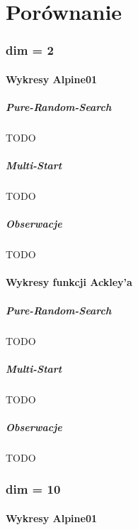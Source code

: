 \documentclass{lab}
\begin{document}
\subsection{}

\newpage
\part{Porównanie}
\section{dim = 2}
\subsection{Wykresy Alpine01}
\subsubsection{Pure-Random-Search}
TODO

\subsubsection{Multi-Start}
TODO

\subsubsection{Obserwacje}
TODO

\subsection{Wykresy funkcji Ackley’a}
\subsubsection{Pure-Random-Search}
TODO

\subsubsection{Multi-Start}
TODO

\subsubsection{Obserwacje}
TODO

\section{dim = 10}
\subsection{Wykresy Alpine01}
\end{document}
